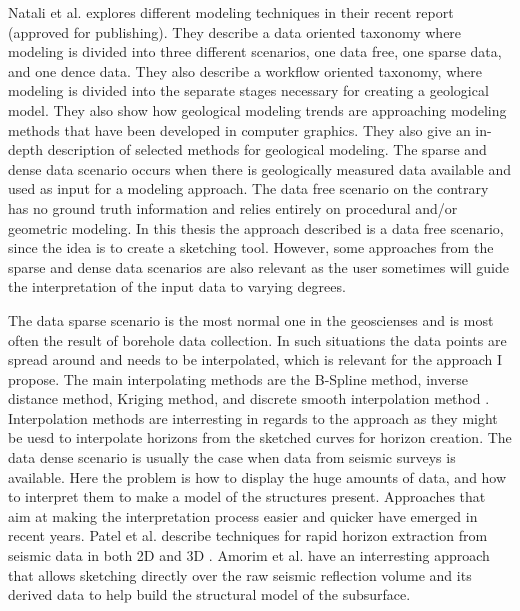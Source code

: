 \documentclass[a4paper,12pt]{report}
\begin{document}
Natali et al. explores different modeling techniques in their recent report \cite{natali2013modeling} (approved for publishing). They describe a data oriented taxonomy where modeling is divided into three different scenarios, one data free, one sparse data, and one dence data. They also describe a workflow oriented taxonomy, where modeling is divided into the separate stages necessary for creating a geological model. They also show how geological modeling trends are approaching modeling methods that have been developed in computer graphics. They also give an in-depth description of selected methods for geological modeling. The sparse and dense data scenario occurs when there is geologically measured data available and used as input for a modeling approach. The data free scenario on the contrary has no ground truth information and relies entirely on procedural and/or geometric modeling. In this thesis the approach described is a data free scenario, since the idea is to create a sketching tool. However, some approaches from the sparse and dense data scenarios are also relevant as the user sometimes will guide the interpretation of the input data to varying degrees. 

The data sparse scenario is the most normal one in the geoscienses and is most often the result of borehole data collection. In such situations the data points are spread around and needs to be interpolated, which is relevant for the approach I propose. The main interpolating methods are the B-Spline method, inverse distance method, Kriging method, and discrete smooth interpolation method \cite{mallet1992discrete, mallet1997discrete}. Interpolation methods are interresting in regards to the approach as they might be uesd to interpolate horizons from the sketched curves for horizon creation. The data dense scenario is usually the case when data from seismic surveys is available. Here the problem is how to display the huge amounts of data, and how to interpret them to make a model of the structures present. Approaches that aim at making the interpretation process easier and quicker have emerged in recent years. Patel et al. describe techniques for rapid horizon extraction from seismic data in both 2D \cite{patel2008seismic} and 3D \cite{patel2010seismic}. Amorim et al. \cite{amorim2012sketch} have an interresting approach that allows sketching directly over the raw seismic reflection volume and its derived data to help build the structural model of the subsurface.
\end{document}
